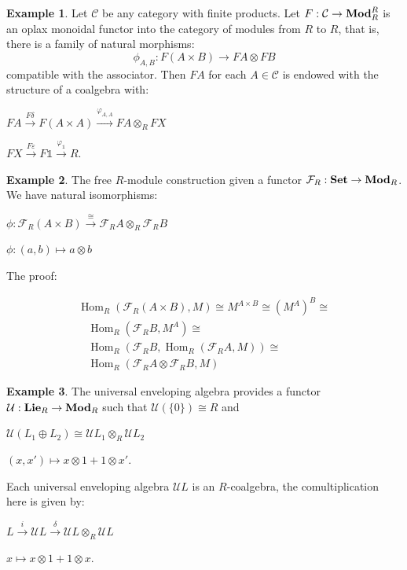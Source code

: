 \documentclass[8pt]{article}
\theoremstyle{definition}
\theoremstyle{definition}
\theoremstyle{definition}
\theoremstyle{definition}
\theoremstyle{definition}
\theoremstyle{definition}
\theoremstyle{definition}
\theoremstyle{definition}
\theoremstyle{definition}
\theoremstyle{definition}
\theoremstyle{definition}
\theoremstyle{definition}
\newtheorem{example}{Example}[section]
\theoremstyle{definition}
\theoremstyle{definition}
\theoremstyle{question}
\begin{document}
\begin{example}
  Let $\mathcal{C}$ be any category with finite products. Let $F : \mathcal{C} \to {\bf Mod}^R_R$
  is an oplax monoidal functor into the category of modules from $R$ to $R$, that is, there is a
  family of natural morphisms:
  \[
  \phi_{A,B} : F(A \times B) \to F A \otimes F B
  \]
  compatible with the associator. Then $F A$ for each $A \in \mathcal{C}$ is endowed with
  the structure of a coalgebra with:
  \begin{center}
    $F A \xrightarrow{F \delta} F (A \times A) \xrightarrow{\varphi_{A, A}} F A \otimes_R F X$

    $F X \xrightarrow{F \varepsilon} F \mathds{1} \xrightarrow{\varphi_{\mathds{1}}} R$.
  \end{center}
\end{example}

\begin{example}
  The free $R$-module construction given a functor $\mathcal{F}_R : {\bf Set} \to {\bf Mod}_R$.
  We have natural isomorphisms:
  \begin{center}
    $\phi : \mathcal{F}_R(A \times B) \xrightarrow{\cong} \mathcal{F}_R A \otimes_R \mathcal{F}_R B$

    $\phi : (a, b) \mapsto a \otimes b$
  \end{center}
  The proof:

  \[
  \begin{array}{lll}
    & \operatorname{Hom}_R(\mathcal{F}_R(A \times B), M) \cong M^{A \times B} \cong (M^A)^B \cong & \\
    & \:\:\:\: \operatorname{Hom}_R(\mathcal{F}_R B, M^A) \cong & \\
    & \:\:\:\: \operatorname{Hom}_R(\mathcal{F}_R B, \operatorname{Hom}_R(\mathcal{F}_R A, M)) \cong & \\
    & \:\:\:\: \operatorname{Hom}_R(\mathcal{F}_R A \otimes \mathcal{F}_R B, M) &
  \end{array}
  \]
\end{example}

\begin{example}
  The universal enveloping algebra provides a functor $\mathcal{U} : {\bf Lie}_R \to {\bf Mod}_R$
  such that $\mathcal{U}(\{ 0 \}) \cong R$ and
  \begin{center}
    $\mathcal{U}(L_1 \oplus L_2) \cong \mathcal{U}L_1 \otimes_R \mathcal{U} L_2$

    $(x, x') \mapsto x \otimes 1 + 1 \otimes x'$.
  \end{center}

  Each universal enveloping algebra $\mathcal{U} L$ is an $R$-coalgebra, the comultiplication here is
  given by:
  \begin{center}
    $L \xrightarrow{i} \mathcal{U} L \xrightarrow{\delta} \mathcal{U} L \otimes_R \mathcal{U} L$

    $x \mapsto x \otimes 1 + 1 \otimes x$.
  \end{center}
\end{example}
\end{document}
